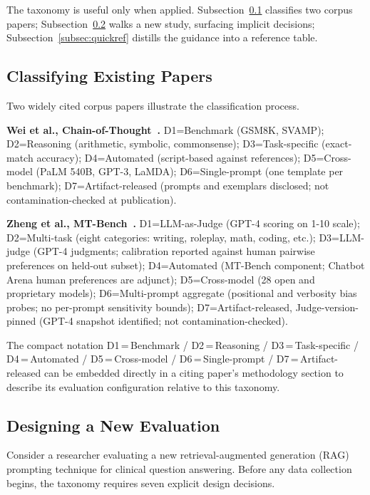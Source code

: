 \documentclass[acmsmall, nonacm, screen]{acmart}
\begin{document}
The taxonomy is useful only when applied. Subsection~\ref{subsec:classify}
classifies two corpus papers; Subsection~\ref{subsec:design} walks a
new study, surfacing implicit decisions;
Subsection~\ref{subsec:quickref} distills the guidance into a
reference table.

\subsection{Classifying Existing Papers}
\label{subsec:classify}

Two widely cited corpus papers illustrate the classification process.

\textbf{Wei et al., Chain-of-Thought~\cite{wei2022chain}.}
D1=Benchmark (GSM8K, SVAMP); D2=Reasoning (arithmetic, symbolic,
commonsense); D3=Task-specific (exact-match accuracy);
D4=Automated (script-based against references); D5=Cross-model
(PaLM 540B, GPT-3, LaMDA); D6=Single-prompt (one template per
benchmark); D7=Artifact-released (prompts and exemplars disclosed;
not contamination-checked at publication).

\textbf{Zheng et al., MT-Bench~\cite{zheng2023judging}.}
D1=LLM-as-Judge (GPT-4 scoring on 1-10 scale); D2=Multi-task
(eight categories: writing, roleplay, math, coding, etc.);
D3=LLM-judge (GPT-4 judgments; calibration reported against human
pairwise preferences on held-out subset); D4=Automated (MT-Bench
component; Chatbot Arena human preferences are adjunct);
D5=Cross-model (28 open and proprietary models); D6=Multi-prompt
aggregate (positional and verbosity bias probes; no per-prompt
sensitivity bounds); D7=Artifact-released, Judge-version-pinned
(GPT-4 snapshot identified; not contamination-checked).

The compact notation D1\,=\,Benchmark / D2\,=\,Reasoning /
D3\,=\,Task-specific / D4\,=\,Automated / D5\,=\,Cross-model /
D6\,=\,Single-prompt / D7\,=\,Artifact-released can be embedded
directly in a citing paper's methodology section to describe its
evaluation configuration relative to this taxonomy.

\subsection{Designing a New Evaluation}
\label{subsec:design}

Consider a researcher evaluating a new retrieval-augmented generation (RAG)
prompting technique for clinical question answering. Before any data
collection begins, the taxonomy requires seven explicit design decisions.
\end{document}
